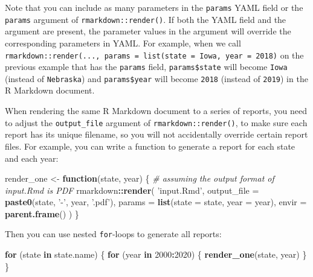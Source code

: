\documentclass[
  11pt,
]{krantz}
\newenvironment{Shaded}{\begin{snugshade}}{\end{snugshade}}
\newcommand{\CommentTok}[1]{\textcolor[rgb]{0.37,0.37,0.37}{\textit{#1}}}
\newcommand{\ControlFlowTok}[1]{\textcolor[rgb]{0.27,0.27,0.27}{\textbf{#1}}}
\newcommand{\DataTypeTok}[1]{\textcolor[rgb]{0.27,0.27,0.27}{#1}}
\newcommand{\DecValTok}[1]{\textcolor[rgb]{0.06,0.06,0.06}{#1}}
\newcommand{\KeywordTok}[1]{\textcolor[rgb]{0.27,0.27,0.27}{\textbf{#1}}}
\newcommand{\NormalTok}[1]{#1}
\newcommand{\OperatorTok}[1]{\textcolor[rgb]{0.43,0.43,0.43}{\textbf{#1}}}
\newcommand{\StringTok}[1]{\textcolor[rgb]{0.5,0.5,0.5}{#1}}
\begin{document}
Note that you can include as many parameters in the \texttt{params} YAML field or the \texttt{params} argument of \texttt{rmarkdown::render()}. If both the YAML field and the argument are present, the parameter values in the argument will override the corresponding parameters in YAML. For example, when we call \texttt{rmarkdown::render(...,\ params\ =\ list(state\ =\ \textquotesingle{}Iowa\textquotesingle{},\ year\ =\ 2018)} on the previous example that has the \texttt{params} field, \texttt{params\$state} will become \texttt{Iowa} (instead of \texttt{Nebraska}) and \texttt{params\$year} will become \texttt{2018} (instead of \texttt{2019}) in the R Markdown document.

When rendering the same R Markdown document to a series of reports, you need to adjust the \texttt{output\_file} argument of \texttt{rmarkdown::render()}, to make sure each report has its unique filename, so you will not accidentally override certain report files. For example, you can write a function to generate a report for each state and each year:

\begin{Shaded}
\begin{Highlighting}[]
\NormalTok{render_one <-}\StringTok{ }\ControlFlowTok{function}\NormalTok{(state, year) \{}
  \CommentTok{# assuming the output format of input.Rmd is PDF}
\NormalTok{  rmarkdown}\OperatorTok{::}\KeywordTok{render}\NormalTok{(}
    \StringTok{'input.Rmd'}\NormalTok{,}
    \DataTypeTok{output_file =} \KeywordTok{paste0}\NormalTok{(state, }\StringTok{'-'}\NormalTok{, year, }\StringTok{'.pdf'}\NormalTok{),}
    \DataTypeTok{params =} \KeywordTok{list}\NormalTok{(}\DataTypeTok{state =}\NormalTok{ state, }\DataTypeTok{year =}\NormalTok{ year),}
    \DataTypeTok{envir =} \KeywordTok{parent.frame}\NormalTok{()}
\NormalTok{  )}
\NormalTok{\}}
\end{Highlighting}
\end{Shaded}

Then you can use nested \texttt{for}-loops to generate all reports:

\begin{Shaded}
\begin{Highlighting}[]
\ControlFlowTok{for}\NormalTok{ (state }\ControlFlowTok{in}\NormalTok{ state.name) \{}
  \ControlFlowTok{for}\NormalTok{ (year }\ControlFlowTok{in} \DecValTok{2000}\OperatorTok{:}\DecValTok{2020}\NormalTok{) \{}
    \KeywordTok{render_one}\NormalTok{(state, year)}
\NormalTok{  \}}
\NormalTok{\}}
\end{Highlighting}
\end{Shaded}
\end{document}
